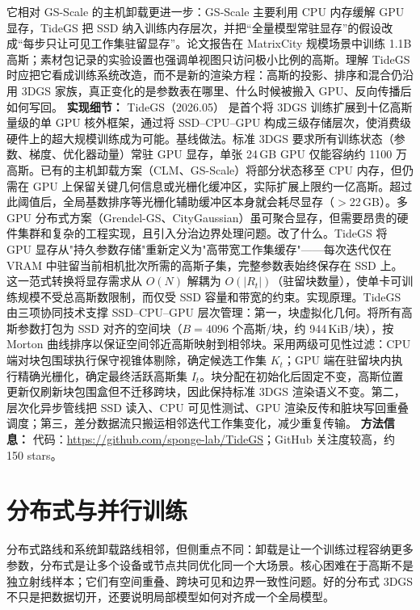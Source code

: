 它相对 GS-Scale 的主机卸载更进一步：GS-Scale 主要利用 CPU 内存缓解 GPU 显存，TideGS 把 SSD 纳入训练内存层次，并把“全量模型常驻显存”的假设改成“每步只让可见工作集驻留显存”。论文报告在 MatrixCity 规模场景中训练 1.1B 高斯；素材包记录的实验设置也强调单视图只访问极小比例的高斯。理解 TideGS 时应把它看成训练系统改造，而不是新的渲染方程：高斯的投影、排序和混合仍沿用 3DGS 家族，真正变化的是参数表在哪里、什么时候被搬入 GPU、反向传播后如何写回。
\textbf{实现细节：} TideGS（2026.05） 是首个将 3DGS 训练扩展到十亿高斯量级的单 GPU 核外框架，通过将 SSD--CPU--GPU 构成三级存储层次，使消费级硬件上的超大规模训练成为可能。基线做法。标准 3DGS 要求所有训练状态（参数、梯度、优化器动量）常驻 GPU 显存，单张 24\,GB GPU 仅能容纳约 1100 万高斯。已有的主机卸载方案（CLM、GS-Scale）将部分状态移至 CPU 内存，但仍需在 GPU 上保留关键几何信息或光栅化缓冲区，实际扩展上限约一亿高斯。超过此阈值后，全局基数排序等光栅化辅助缓冲区本身就会耗尽显存（$>$22\,GB）。多 GPU 分布式方案（Grendel-GS、CityGaussian）虽可聚合显存，但需要昂贵的硬件集群和复杂的工程实现，且引入分治边界处理问题。改了什么。TideGS 将 GPU 显存从"持久参数存储"重新定义为"高带宽工作集缓存"——每次迭代仅在 VRAM 中驻留当前相机批次所需的高斯子集，完整参数表始终保存在 SSD 上。这一范式转换将显存需求从 $O(N)$ 解耦为 $O(|R_t|)$（驻留块数量），使单卡可训练规模不受总高斯数限制，而仅受 SSD 容量和带宽的约束。实现原理。TideGS 由三项协同技术支撑 SSD--CPU--GPU 层次管理：第一，块虚拟化几何。将所有高斯参数打包为 SSD 对齐的空间块（$B=4096$ 个高斯/块，约 944\,KiB/块），按 Morton 曲线排序以保证空间邻近高斯映射到相邻块。采用两级可见性过滤：CPU 端对块包围球执行保守视锥体剔除，确定候选工作集 $K_t$；GPU 端在驻留块内执行精确光栅化，确定最终活跃高斯集 $I_t$。块分配在初始化后固定不变，高斯位置更新仅刷新块包围盒但不迁移跨块，因此保持标准 3DGS 渲染语义不变。第二，层次化异步管线把 SSD 读入、CPU 可见性测试、GPU 渲染反传和脏块写回重叠调度；第三，差分数据流只搬运相邻迭代工作集变化，减少重复传输。
\textbf{方法信息：} 代码：\url{https://github.com/sponge-lab/TideGS}；GitHub 关注度较高，约 150 stars。



\section{分布式与并行训练}

分布式路线和系统卸载路线相邻，但侧重点不同：卸载是让一个训练过程容纳更多参数，分布式是让多个设备或节点共同优化同一个大场景。核心困难在于高斯不是独立射线样本；它们有空间重叠、跨块可见和边界一致性问题。好的分布式 3DGS 不只是把数据切开，还要说明局部模型如何对齐成一个全局模型。


